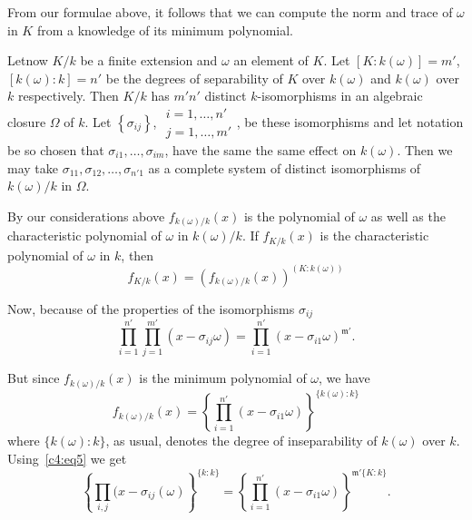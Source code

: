  From our formulae above, it follows that we can compute the norm and
 trace of $\omega$ in $K$ from a knowledge of its minimum
 polynomial. 
 
 Let\pageoriginale now $ K/k $ be a finite extension and $ \omega$ an
 element of $K$. Let $[K: k (\omega)] = m'$, $[k(\omega):k] = n'$ be
 the degrees of separability of $K$ over $k(\omega)$ and  $ k (\omega)
 $ over $k$ respectively. Then $K/k$ has $m' n' $ distinct
 $k$-isomorphisms in an algebraic  closure $ \Omega $ of $k$. Let $ \left\{
 \sigma_{ij} \right\}$, $\begin{smallmatrix} i = 1, \ldots , n'\\ j = 1,
   \ldots , m' \end{smallmatrix} $, be these isomorphisms and let notation
 be  so chosen  that  $ \sigma_{i 1} , \ldots , \sigma_{i m} $, have
 the same the same effect on $ k (\omega) $. Then we may take $
 \sigma_{1 1} , \sigma_{1 2} , \ldots , \sigma_{n' 1} $ as  a
 complete  system of distinct isomorphisms of $ k (\omega) / k $ in $
 \Omega $.  
 
 By our considerations above $ f_{k (\omega) /k} (x) $ is the
 polynomial of $ \omega $ as  well  as the characteristic polynomial
 of $ \omega $ in $k (\omega) / k$. If $f_{K/k} (x)$ is the
 characteristic polynomial of $\omega$ in $k$, then 
  \begin{equation*}
f_{K/k} (x) = ( f_{k (\omega)/k }(x) ) ^{( K : k (\omega ) )} \tag{4}\label{c4:eq4}
 \end{equation*} 
 
 Now, because of the properties of the isomorphisms $\sigma_{ij}$
 \begin{equation*}
\prod^{n'}_{i=1} \prod^{m'}_{j=1} (x-\sigma_{ij} \omega ) =
\prod^{n'}_{i=1} (x-\sigma_{i1} \omega )^{\mathfrak{m'}}.
\tag{5}\label{c4:eq5} 
 \end{equation*} 
 
 But since  $ f_{k (\omega)/k } (x) $ is the minimum polynomial of $
 \omega $, we have    
 $$ 
 f_{k (\omega)/k} (x)   = \left\{ \prod^{n'}_{i =1} (x- \sigma_{i1} 
 \omega ) \right\}^{\{ k (\omega) : k\}}  
 $$
 where $ \{k(\omega):k\} $, as usual, denotes the degree of
 inseparability of $k(\omega)$ over $k$. Using~\eqref{c4:eq5} we get  
 $$ 
\left \{ \prod_{i,j} (x-\sigma_{ij}(\omega) \right\}^{\{ k:k\}}  = \left\{
 \prod^{n'}_{i =1} (x-\sigma_{i1}\omega)\right\}^{\mathfrak{m}' \{K
   : k\}} .
 $$
 
